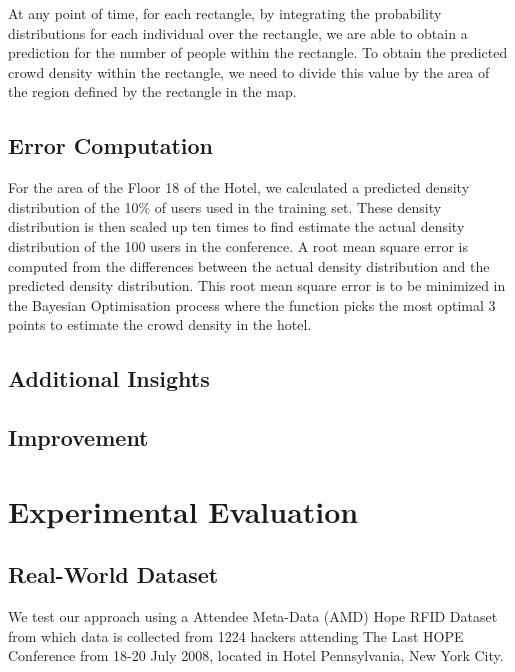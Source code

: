 \documentclass[letterpaper]{article}
\begin{document}
At any point of time, for each rectangle, by integrating the probability distributions for each individual over the rectangle, we are able to obtain a prediction for the number of people within the rectangle. To obtain the predicted crowd density within the rectangle, we need to divide this value by the area of the region defined by the rectangle in the map.\\



\subsection{Error Computation}

For the area of the Floor 18 of the Hotel, we calculated a predicted density distribution of the 10\% of users used in the training set. These density distribution is then scaled up ten times to find estimate the actual density distribution of the 100 users in the conference. A root mean square error is computed from the differences between the actual density distribution and the predicted density distribution. This root mean square error is to be minimized in the Bayesian Optimisation process where the function picks the most optimal 3 points to estimate the crowd density in the hotel.

\subsection{Additional Insights}


\subsection{Improvement}



\section{Experimental Evaluation}

\subsection{Real-World Dataset}

We test our approach using a Attendee Meta-Data (AMD) Hope RFID Dataset from which data is collected from 1224 hackers attending The Last HOPE Conference from 18-20 July 2008, located in Hotel Pennsylvania, New York City.\\
\end{document}
